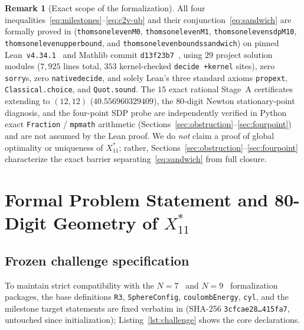 \documentclass[11pt,reqno]{amsart}
\renewcommand{\_}{\origunderscore\allowbreak}
\theoremstyle{definition}
\newtheorem{remark}[theorem]{Remark}
\newcommand{\Xstar}{X^*_{11}}
\begin{document}
\begin{remark}[Exact scope of the formalization]\label{rem:scope}
All four inequalities~\eqref{eq:milestones}--\eqref{eq:c2v-ub} and their conjunction~\eqref{eq:sandwich} are formally proved in  (\texttt{thomson\_eleven\_M0}, \texttt{thomson\_eleven\_M1}, \texttt{thomson\_eleven\_sdp\_M10}, \texttt{thomson\_eleven\_upper\_bound}, and \texttt{thomson\_eleven\_bounds\_sandwich}) on pinned Lean~\texttt{v4.34.1}~\cite{deMouraUllrich2021} and Mathlib commit \texttt{d13f23b7}~\cite{Mathlib2020}, using $29$ project solution modules ($7{,}925$ lines total, $353$ kernel-checked \texttt{decide +kernel} sites), zero \texttt{sorry}s, zero \texttt{native\_decide}, and solely Lean's three standard axioms \texttt{propext}, \texttt{Classical.choice}, and \texttt{Quot.sound}.
The $15$ exact rational Stage~A certificates extending to $(12,12)$ ($40.556960329409$), the $80$-digit Newton stationary-point diagnosis, and the four-point SDP probe are independently verified in Python exact \texttt{Fraction} / \texttt{mpmath} arithmetic (Sections~\ref{sec:obstruction}--\ref{sec:fourpoint}) and are not assumed by the Lean proof.
We do \emph{not} claim a proof of global optimality or uniqueness of $\Xstar$; rather, Sections~\ref{sec:obstruction}--\ref{sec:fourpoint} characterize the exact barrier separating~\eqref{eq:sandwich} from full closure.
\end{remark}

\section{Formal Problem Statement and 80-Digit Geometry of \texorpdfstring{$\Xstar$}{X*11}}\label{sec:geometry}

\subsection{Frozen challenge specification}\label{subsec:challenge}
To maintain strict compatibility with the $N = 7$~\cite{ValsN72026} and $N = 9$~\cite{Li2026N9} formalization packages, the base definitions \texttt{R3}, \texttt{SphereConfig}, \texttt{coulombEnergy}, \texttt{cyl}, and the milestone target statements are fixed verbatim in  (SHA-256 \texttt{3cfcae28\ldots 415fa7}, untouched since initialization); Listing~\ref{lst:challenge} shows the core declarations.
\end{document}
